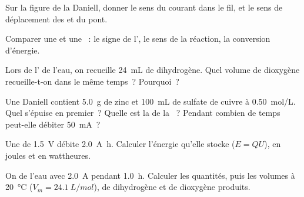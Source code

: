 \begin{exercise}[$\star\star$]\label{exo:g12:cells-and-electrolysis:9}
Sur la figure de la  Daniell, donner le sens du courant dans le fil,
et le sens de déplacement des   et  du pont.
\end{exercise}

\begin{exercise}[$\star\star$]\label{exo:g12:cells-and-electrolysis:10}
Comparer une  et une ~: le signe de l', le sens de
la réaction, la conversion d'énergie.
\end{exercise}

\begin{exercise}[$\star\star$]\label{exo:g12:cells-and-electrolysis:11}
Lors de l' de l'eau, on recueille \qty{24}{mL} de
dihydrogène. Quel volume de dioxygène recueille-t-on dans le même
temps~? Pourquoi~?
\end{exercise}

\begin{exercise}[$\star\star\star$]\label{exo:g12:cells-and-electrolysis:12}
Une  Daniell contient \qty{5.0}{g} de zinc et \qty{100}{mL} de
sulfate de cuivre à \qty{0.50}{mol/L}. Quel  s'épuise en
premier~? Quelle est la  de la ~? Pendant combien de temps
peut-elle débiter \qty{50}{mA}~?
\end{exercise}

\begin{exercise}[$\star\star\star$]\label{exo:g12:cells-and-electrolysis:13}
Une  de \qty{1.5}{V} débite \qty{2.0}{A.h}. Calculer l'énergie
qu'elle stocke ($E = Q U$), en joules et en wattheures.
\end{exercise}

\begin{exercise}[$\star\star\star$]\label{exo:g12:cells-and-electrolysis:14}
On  de l'eau avec \qty{2.0}{A} pendant \qty{1.0}{h}. Calculer
les quantités, puis les volumes à \qty{20}{\celsius}
($V_m = \qty{24.1}{L/mol}$),
de dihydrogène et de dioxygène produits.
\end{exercise}

